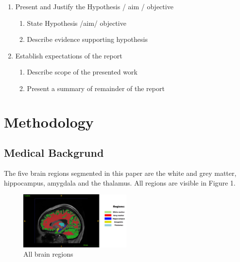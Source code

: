 \documentclass[conference]{IEEEtran}
\begin{document}
{\begin{enumerate}
\begin{enumerate}
	\end{enumerate}
\item Present and Justify the Hypothesis / aim / objective
	\begin{enumerate}
	\item State Hypothesis /aim/ objective
	\item Describe evidence supporting hypothesis
	\end{enumerate}
\item Establish expectations of the report
	\begin{enumerate}
	\item Describe scope of the presented work
	\item Present a summary of remainder of the report\\
	\end{enumerate}
\end{enumerate} 
}




\section{Methodology}
\subsection{Medical Backgrund}
	The five brain regions segmented in this paper are the white and grey matter, hippocampus, amygdala and the thalamus. All regions are visible in Figure 1.

	\begin{figure}[h]
		\centering
		\includegraphics[width=0.5\textwidth]{T1native_all_regions_labelled.png}
		\caption{All brain regions}
		\label{fig:figure1}
	\end{figure}
\end{document}
